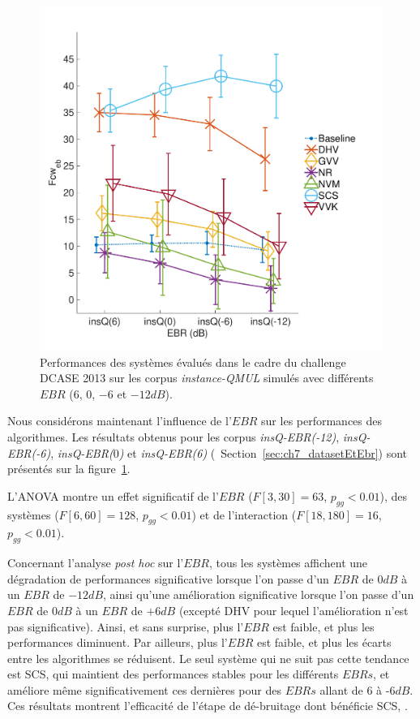 \begin{figure}[t]
\begin{center}
\includegraphics[width=1\columnwidth]{gfx/ch_7/dcase2013_2}
\caption{Performances des systèmes évalués dans le cadre du challenge DCASE 2013 sur les corpus \emph{instance-QMUL} simulés avec différents $EBR$ ($6$, $0$, $-6$ et $-12dB$).}
\label{fig:ebr} 
\end{center}
\end{figure}

Nous considérons maintenant l'influence de l'$EBR$ sur les performances des algorithmes. Les résultats obtenus pour les corpus \emph{insQ-EBR(-12)}, \emph{insQ-EBR(-6)}, \emph{insQ-EBR($0$)} et \emph{insQ-EBR(6)} (\cf~Section~\ref{sec:ch7_datasetEtEbr}) sont présentés sur la figure~\ref{fig:ebr}. 

L'ANOVA montre un effet significatif de l'$EBR$ ($F[3,30]=63$, $p_{gg}<0.01$), des systèmes ($F[6,60]=128$, $p_{gg}<0.01$) et de l'interaction ($F[18,180]=16$, $p_{gg}<0.01$).

Concernant l'analyse \emph{post hoc} sur l'$EBR$, tous les systèmes affichent une dégradation de performances significative lorsque l'on passe d'un $EBR$ de $0dB$ à un $EBR$ de $-12dB$, ainsi qu'une amélioration significative lorsque l'on passe d'un $EBR$ de $0dB$ à un $EBR$ de $+6dB$ (excepté DHV pour lequel l'amélioration n'est pas significative). Ainsi, et sans surprise, plus l'$EBR$ est faible, et plus les performances diminuent. Par ailleurs, plus l'$EBR$ est faible, et plus les écarts entre les algorithmes se réduisent. Le seul système qui ne suit pas cette tendance est SCS, qui maintient des performances stables pour les différents $EBRs$, et améliore même significativement ces dernières pour des $EBRs$ allant de $6$ à -6$dB$. Ces résultats montrent l'efficacité de l'étape de dé-bruitage dont bénéficie SCS,  \citep{SCS}. \\

